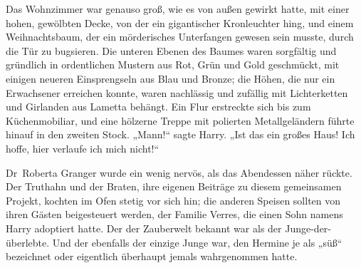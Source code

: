 Das Wohnzimmer war genauso groß, wie es von außen gewirkt hatte, mit einer hohen, gewölbten Decke, von der ein gigantischer Kronleuchter hing, und einem Weihnachtsbaum, der ein mörderisches Unterfangen gewesen sein musste, durch die Tür zu bugsieren. Die unteren Ebenen des Baumes waren sorgfältig und gründlich in ordentlichen Mustern aus Rot, Grün und Gold geschmückt, mit einigen neueren Einsprengseln aus Blau und Bronze; die Höhen, die nur ein Erwachsener erreichen konnte, waren nachlässig und zufällig mit Lichterketten und Girlanden aus Lametta behängt. Ein Flur erstreckte sich bis zum Küchenmobiliar, und eine hölzerne Treppe mit polierten Metallgeländern führte hinauf in den zweiten Stock.
„Mann!“ sagte Harry.
„Ist das ein großes Haus! Ich hoffe, hier verlaufe ich mich nicht!“

\later

Dr~Roberta Granger wurde ein wenig nervös, als das Abendessen näher rückte. Der Truthahn und der Braten, ihre eigenen Beiträge zu diesem gemeinsamen Projekt, kochten im Ofen stetig vor sich hin; die anderen Speisen sollten von ihren Gästen beigesteuert werden, der Familie Verres, die einen Sohn namens Harry adoptiert hatte. Der der Zauberwelt bekannt war als der Junge-der-überlebte. Und der ebenfalls der einzige Junge war, den Hermine je als „süß“ bezeichnet oder eigentlich überhaupt jemals wahrgenommen hatte.


